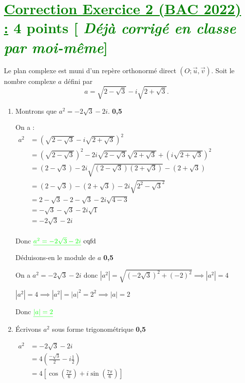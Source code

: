 \documentclass[12pt,a4paper]{article}
\begin{document}
\section*{\textcolor{green}{\underline{Correction Exercice 2 (BAC 2022) :} 4 points [\textit{ Déjà corrigé en classe par moi-même}]}}
Le plan complexe est muni d’un repère orthonormé direct $(O; \vec{u}, \vec{v})$. Soit le nombre complexe $a$ défini par 
\[
a = \sqrt{2 - \sqrt{3}} - i\sqrt{2 + \sqrt{3}}.
\]

\begin{enumerate}
    \item Montrons que $a^2 = -2\sqrt{3} - 2i$. \hfill \textbf{0,5}
    
     On a : \\
     $
     \begin{aligned}
     a^{2} &= \left( \sqrt{2 - \sqrt{3}} - i\sqrt{2 + \sqrt{3}}\right)^{2}\\
     &=\left( \sqrt{2 - \sqrt{3}}\right)^{2} -2i\sqrt{2 - \sqrt{3}}\sqrt{2 + \sqrt{3}} + \left( i\sqrt{2 + \sqrt{3}}\right)^{2}\\
     &=\left( 2 - \sqrt{3} \right) -2i\sqrt{\left( 2 - \sqrt{3} \right)\left( 2 + \sqrt{3}\right)} - \left( 2 + \sqrt{3}\right)\\
     &=\left( 2 - \sqrt{3} \right)  - \left( 2 + \sqrt{3}\right)-2i\sqrt{ 2^{2} - \sqrt{3}^{2}}\\
     &= 2 - \sqrt{3}   -  2 - \sqrt{3}-2i\sqrt{4 - 3}\\
     &= - \sqrt{3} - \sqrt{3}-2i\sqrt{1}\\
     &= -2\sqrt{3}-2i\\
     \end{aligned}
     $
     
     Donc $\textcolor{green}{\underline{a^2 = -2\sqrt{3} - 2i}} \text{ cqfd}$

	Déduisons-en le module de $a$ \hfill \textbf{0,5}
	
	On a $a^2 = -2\sqrt{3} - 2i$ donc $|a^2|=\sqrt{(-2\sqrt{3})^{2} + (-2)^{2} } \implies |a^2|=4$
	
	$|a^2|=4 \implies |a^2|=|a|^2=2^{2} \implies |a|=2$
	
	Donc $\textcolor{green}{\underline{|a|=2}} $
    \item Écrivons $a^2$ sous forme trigonométrique \hfill \textbf{0,5}
    
     $
     \begin{aligned}
     a^2&= -2\sqrt{3}-2i\\
     	&=4\left(\frac{-\sqrt{3}}{2}-i\frac{1}{2}\right)\\
     	&=4\left[ \cos\left( \frac{7\pi}{6}\right) +i\sin\left( \frac{7\pi}{6}\right)  \right]
     \end{aligned}
     $
     

\end{enumerate}
\end{document}
